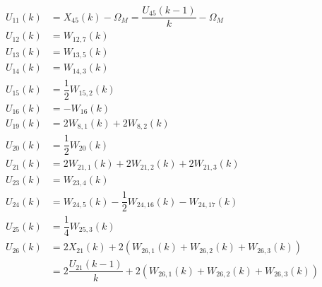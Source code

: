 \begin{align} \label{eq:allRecRel2}
\begin{split}
U_{11} \left(k\right)&= X_{45} \left(k\right)-\Omega_{M}= \dfrac{U_{45} \left(k-1\right)}{k}-\Omega_{M} \\
U_{12} \left(k\right)&= W_{12,7}\left(k\right)\\
U_{13} \left(k\right)&= W_{13,5}\left(k\right)\\
U_{14} \left(k\right)&= W_{14,3}\left(k\right)\\
U_{15} \left(k\right)&= \dfrac{1}{2}W_{15,2}\left(k\right)\\
U_{16} \left(k\right)&= -W_{16}\left(k\right)\\
U_{19} \left(k\right)&= 2W_{8,1}\left(k\right)+2W_{8,2}\left(k\right)\\
U_{20} \left(k\right)&= \dfrac{1}{2}W_{20}\left(k\right)\\
U_{21} \left(k\right)&= 2W_{21,1}\left(k\right)+2W_{21,2}\left(k\right)+2W_{21,3}\left(k\right)\\
U_{23} \left(k\right)&= W_{23,4}\left(k\right)\\
U_{24} \left(k\right)&=  W_{24,5}\left(k\right)-\dfrac{1}{2}W_{24,16}\left(k\right)-W_{24,17}\left(k\right)\\
U_{25} \left(k\right)&=  \dfrac{1}{4}W_{25,3}\left(k\right)\\
U_{26} \left(k\right)&=  2X_{21}\left(k\right)+2\left(W_{26,1}\left(k\right)+W_{26,2}\left(k\right)+W_{26,3}\left(k\right)\right)\\
&=2\dfrac{U_{21}\left(k-1\right)}{k}+2\left(W_{26,1}\left(k\right)+W_{26,2}\left(k\right)+W_{26,3}\left(k\right)\right)\\
\end{split}
\end{align}

